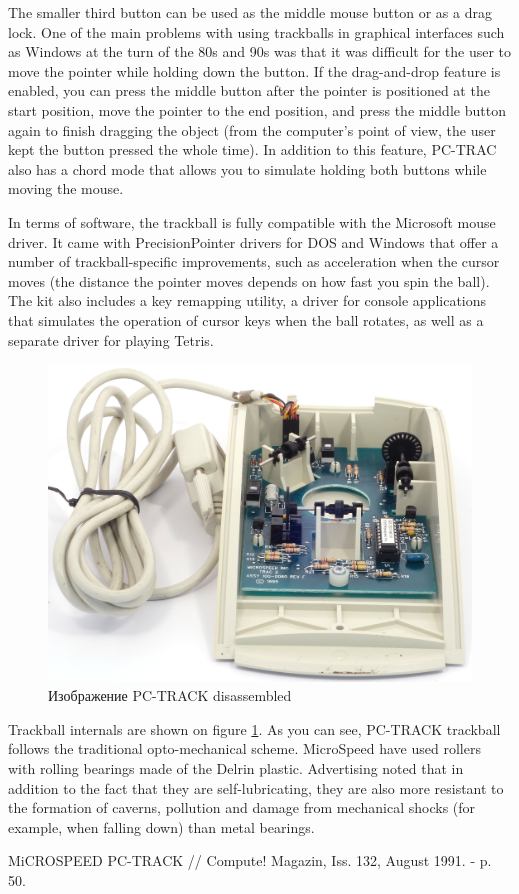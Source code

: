 \documentclass[11pt, a4paper]{article}
\begin{document}
The smaller third button can be used as the middle mouse button or as a drag lock. One of the main problems with using trackballs in graphical interfaces such as Windows at the turn of the 80s and 90s was that it was difficult for the user to move the pointer while holding down the button. If the drag-and-drop feature is enabled, you can press the middle button after the pointer is positioned at the start position, move the pointer to the end position, and press the middle button again to finish dragging the object (from the computer's point of view, the user kept the button pressed the whole time). In addition to this feature, PC-TRAC also has a chord mode that allows you to simulate holding both buttons while moving the mouse.

In terms of software, the trackball is fully compatible with the Microsoft mouse driver. It came with PrecisionPointer drivers for DOS and Windows that offer a number of trackball-specific improvements, such as acceleration when the cursor moves (the distance the pointer moves depends on how fast you spin the ball). The kit also includes a key remapping utility, a driver for console applications that simulates the operation of cursor keys when the ball rotates, as well as a separate driver for playing Tetris.

\begin{figure}[h]
    \centering
    \includegraphics[scale=0.7]{1991_microspeed_pc-track/inside_30.jpg}
    \caption{Изображение PC-TRACK disassembled}
    \label{fig:PCTRACKInside}
    \end{figure}

Trackball internals are shown on figure \ref{fig:PCTRACKInside}. As you can see, PC-TRACK trackball follows the traditional opto-mechanical scheme. MicroSpeed have used rollers with rolling bearings made of the Delrin plastic. Advertising noted that in addition to the fact that they are self-lubricating, they are also more resistant to the formation of caverns, pollution and damage from mechanical shocks (for example, when falling down) than metal bearings.

\begin{thebibliography}{9}
 MiCROSPEED PC-TRACK // Compute! Magazin,  Iss. 132, August 1991. - p. 50.
\end{thebibliography}
\end{document}
